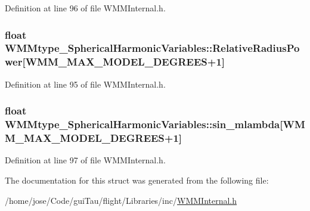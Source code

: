 Definition at line 96 of file W\-M\-M\-Internal.\-h.

\hypertarget{struct_w_m_mtype___spherical_harmonic_variables_a218814ce7d38806060e4c8e49d14d762}{
\subsubsection[{Relative\-Radius\-Power}]{\setlength{\rightskip}{0pt plus 5cm}float W\-M\-Mtype\-\_\-\-Spherical\-Harmonic\-Variables\-::\-Relative\-Radius\-Power\mbox{[}W\-M\-M\-\_\-\-M\-A\-X\-\_\-\-M\-O\-D\-E\-L\-\_\-\-D\-E\-G\-R\-E\-E\-S+1\mbox{]}}}\label{struct_w_m_mtype___spherical_harmonic_variables_a218814ce7d38806060e4c8e49d14d762}


Definition at line 95 of file W\-M\-M\-Internal.\-h.

\hypertarget{struct_w_m_mtype___spherical_harmonic_variables_a727f5fbba1aeb3141b24ef756f47ef1f}{
\subsubsection[{sin\-\_\-mlambda}]{\setlength{\rightskip}{0pt plus 5cm}float W\-M\-Mtype\-\_\-\-Spherical\-Harmonic\-Variables\-::sin\-\_\-mlambda\mbox{[}W\-M\-M\-\_\-\-M\-A\-X\-\_\-\-M\-O\-D\-E\-L\-\_\-\-D\-E\-G\-R\-E\-E\-S+1\mbox{]}}}\label{struct_w_m_mtype___spherical_harmonic_variables_a727f5fbba1aeb3141b24ef756f47ef1f}


Definition at line 97 of file W\-M\-M\-Internal.\-h.



The documentation for this struct was generated from the following file\-:\begin{DoxyCompactItemize}
\item 
/home/jose/\-Code/gui\-Tau/flight/\-Libraries/inc/\hyperlink{_w_m_m_internal_8h}{W\-M\-M\-Internal.\-h}\end{DoxyCompactItemize}
